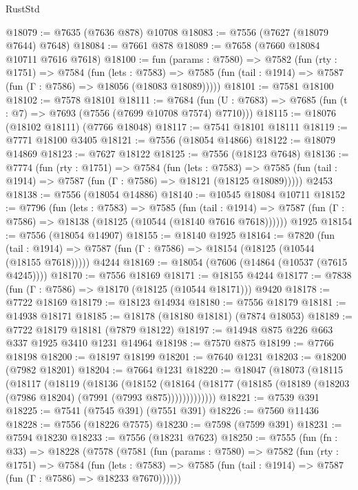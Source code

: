 \begin{lexlean}{RustStd}
\begin{coremodule}
@18079 := @7635 (@7636 @878) @10708
@18083 := @7556 (@7627 (@18079 @7644) @7648)
@18084 := @7661 @878
@18089 := @7658 (@7660 @18084 @10711 @7616 @7618)
@18100 := fun (params : @7580) =>
  @7582
    (fun (rty : @1751) =>
    @7584
      (fun (lets : @7583) =>
      @7585 (fun (tail : @1914) => @7587 (fun (Γ : @7586) => @18056 (@18083 @18089)))))
@18101 := @7581 @18100
@18102 := @7578 @18101
@18111 := @7684
    (fun (U : @7683) => @7685 (fun (t : @7) => @7693 (@7556 (@7699 @10708 @7574) @7710)))
@18115 := @18076 (@18102 @18111) (@7766 @18048)
@18117 := @7541 @18101 @18111
@18119 := @7771 @18100 @3405
@18121 := @7556 (@18054 @14866)
@18122 := @18079 @14869
@18123 := @7627 @18122
@18125 := @7556 (@18123 @7648)
@18136 := @7774
    (fun (rty : @1751) =>
    @7584
      (fun (lets : @7583) =>
      @7585 (fun (tail : @1914) => @7587 (fun (Γ : @7586) => @18121 (@18125 @18089)))))
    @2453
@18138 := @7556 (@18054 @14886)
@18140 := @10545 @18084 @10711
@18152 := @7796
    (fun (lets : @7583) =>
    @7585
      (fun (tail : @1914) =>
      @7587 (fun (Γ : @7586) => @18138 (@18125 (@10544 (@18140 @7616 @7618))))))
    @1925
@18154 := @7556 (@18054 @14907)
@18155 := @18140 @1925
@18164 := @7820
    (fun (tail : @1914) => @7587 (fun (Γ : @7586) => @18154 (@18125 (@10544 (@18155 @7618)))))
    @4244
@18169 := @18054 (@7606 (@14864 (@10537 (@7615 @4245))))
@18170 := @7556 @18169
@18171 := @18155 @4244
@18177 := @7838 (fun (Γ : @7586) => @18170 (@18125 (@10544 @18171))) @9420
@18178 := @7722 @18169
@18179 := @18123 @14934
@18180 := @7556 @18179
@18181 := @14938 @18171
@18185 := @18178 (@18180 @18181) (@7874 @18053)
@18189 := @7722 @18179 @18181 (@7879 @18122)
@18197 := @14948 @875 @226 @663 @337 @1925 @3410 @1231 @14964
@18198 := @7570 @875
@18199 := @7766 @18198
@18200 := @18197 @18199
@18201 := @7640 @1231
@18203 := @18200 (@7982 @18201)
@18204 := @7664 @1231
@18220 := @18047
    (@18073
      (@18115
        (@18117
          (@18119
            (@18136
              (@18152
                (@18164
                  (@18177 (@18185 (@18189 (@18203 (@7986 @18204) (@7991 (@7993 @875)))))))))))))
@18221 := @7539 @391
@18225 := @7541 (@7545 @391) (@7551 @391)
@18226 := @7560 @11436
@18228 := @7556 (@18226 @7575)
@18230 := @7598 (@7599 @391)
@18231 := @7594 @18230
@18233 := @7556 (@18231 @7623)
@18250 := @7555
    (fun (fn : @33) =>
    @18228
      (@7578
        (@7581
          (fun (params : @7580) =>
          @7582
            (fun (rty : @1751) =>
            @7584
              (fun (lets : @7583) =>
              @7585 (fun (tail : @1914) => @7587 (fun (Γ : @7586) => @18233 @7670))))))

\end{coremodule}
\end{lexlean}
